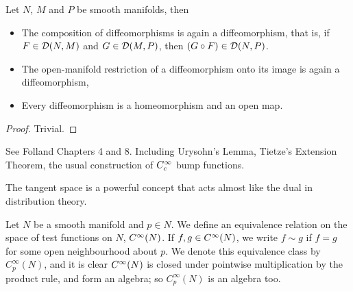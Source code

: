 \documentclass[../main-manifolds.tex]{subfiles}
\begin{document}
\begin{wts}\label{lee-chp2-diffeomorphism-properties}
    Let $N$, $M$ and $P$ be smooth manifolds, then
    \begin{itemize}
        \item The composition of diffeomorphisms is again a diffeomorphism, that is, if $F\in \diffeo[N,M]$ and $G\in \diffeo[M,P]$, then $(G\circ F)\in \diffeo[N,P]$.
        \item The open-manifold restriction of a diffeomorphism onto its image is again a diffeomorphism,
        \item Every diffeomorphism is a homeomorphism and an open map.
    \end{itemize}
\end{wts}
\begin{proof}
    Trivial.
\end{proof}

See Folland Chapters 4 and 8. Including Urysohn's Lemma, Tietze's Extension Theorem, the usual construction of $C_c^\infty$ bump functions.
\newpage

\newpage
{}
The tangent space is a powerful concept that acts almost like the dual in distribution theory.
\begin{definition}\label{lee-chp3:algebra-of-germs-at-p}
    Let $N$ be a smooth manifold and $p\in N$. We define an equivalence relation on the space of test functions on $N$, $\cinf[N]$. If $f,g\in\cinf[N]$, we write $f\sim g$ if $f=g$ for some open neighbourhood about $p$. We denote this equivalence class by $C_p^\infty(N)$, and it is clear $\cinf[N]$ is closed under pointwise multiplication by the product rule, and form an algebra; so $C_p^\infty(N)$ is an algebra too.
\end{definition}
\end{document}
